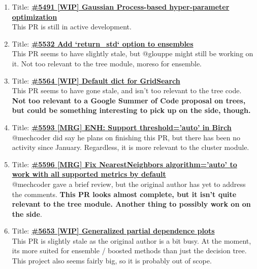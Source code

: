 \documentclass[12pt, oneside]{article}
\begin{document}
\begin{enumerate}
  \item
  Title:
  \textbf{\href{https://github.com/scikit-learn/scikit-learn/pull/5491}
    {\#5491 [WIP] Gaussian Process-based hyper-parameter optimization}}\\
  This PR is still in active development.

  \item
  Title:
  \textbf{\href{https://github.com/scikit-learn/scikit-learn/pull/5532}
    {\#5532 Add `return\_std` option to ensembles}}\\
  This PR seems to have slightly stale, but @glouppe might still be
  working on it. Not too relevant to the tree module, moreso for
  ensemble.

  \item
  Title:
  \textbf{\href{https://github.com/scikit-learn/scikit-learn/pull/5564}
    {\#5564 [WIP] Default dict for GridSearch}}\\
  This PR seems to have gone stale, and isn't too relevant to the tree
  code. \textbf{Not too relevant to a Google Summer of Code proposal on trees, but
    could be something interesting to pick up on the side, though.}

  \item
  Title:
  \textbf{\href{https://github.com/scikit-learn/scikit-learn/pull/5593}
    {\#5593 [MRG] ENH: Support threshold='auto' in Birch}}\\
  @mechcoder did say he plans on finishing this PR, but there has been
  no activity since January. Regardless, it is more relevant to the
  cluster module.

  \item
  Title:
  \textbf{\href{https://github.com/scikit-learn/scikit-learn/pull/5596}
    {\#5596 [MRG] Fix NearestNeighbors algorithm='auto' to work with
      all supported metrics by default}}\\
  @mechcoder gave a brief review, but the original author has yet to
  address the comments. \textbf{This PR looks almost complete, but it
    isn't quite relevant to the tree module. Another thing to possibly
    work on on the side}.

  \item
  Title:
  \textbf{\href{https://github.com/scikit-learn/scikit-learn/pull/5653}
    {\#5653 [WIP] Generalized partial dependence plots}}\\
  This PR is slightly stale as the original author is a bit busy. At
  the moment, its more suited for ensemble / boosted methods than just
  the decision tree. This project also seems fairly big, so it
  is probably out of scope.


\end{enumerate}
\end{document}
